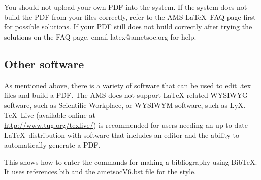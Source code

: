 \documentclass{ametsocV6.1}
\begin{document}
You should not upload your own PDF into
the system. If the system does not build the PDF from your files correctly,
refer to the AMS \LaTeX\ FAQ page first for possible solutions. If your PDF
still does not build correctly after trying the solutions on the FAQ page, email
latex@ametsoc.org for help.

\subsection{Other software}
As mentioned above, there is a variety of software that can be used to edit
.tex files and build a PDF.  The AMS does not support \LaTeX\/-related
WYSIWYG software, such as Scientific Workplace, or WYSIWYM software, such as
LyX.  \TeX\ Live (available online at \\ \url{http://www.tug.org/texlive/}) is
recommended for users needing an up-to-date \LaTeX\ distribution with
software that includes an editor and the ability to automatically generate a
PDF.




 This shows how to enter the commands for making a bibliography using
 BibTeX. It uses references.bib and the ametsocV6.bst file for the style.



\end{document}
